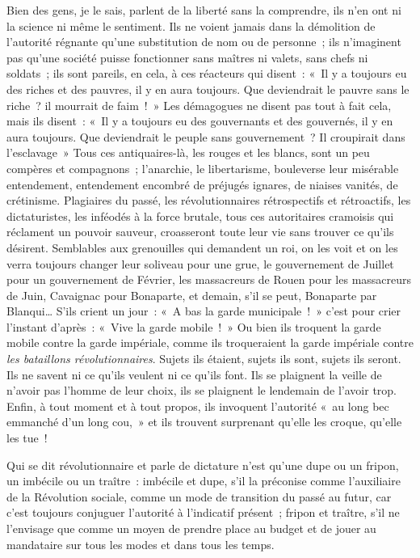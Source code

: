 \documentclass[french,twoside]{book} %
\begin{document}
Bien des gens, je le sais, parlent de la liberté sans la comprendre, ils n’en ont ni la science ni même le sentiment. Ils ne voient jamais dans la démolition de l’autorité régnante qu’une substitution de nom ou de personne ; ils n’imaginent pas qu’une société puisse fonctionner sans maîtres ni valets, sans chefs ni soldats ; ils sont pareils, en cela, à ces réacteurs qui disent : « Il y a toujours eu des riches et des pauvres, il y en aura toujours. Que deviendrait le pauvre sans le riche ? il mourrait de faim ! » Les démagogues ne disent pas tout à fait cela, mais ils disent : « Il y a toujours eu des gouvernants et des gouvernés, il y en aura toujours. Que deviendrait le peuple sans gouvernement ? Il croupirait dans l’esclavage » Tous ces antiquaires-là, les rouges et les blancs, sont un peu compères et compagnons ; l’anarchie, le libertarisme, bouleverse leur misérable entendement, entendement encombré de préjugés ignares, de niaises vanités, de crétinisme. Plagiaires du passé, les révolutionnaires rétrospectifs et rétroactifs, les dictaturistes, les inféodés à la force brutale, tous ces autoritaires cramoisis qui réclament un pouvoir sauveur, croasseront toute leur vie sans trouver ce qu’ils désirent. Semblables aux grenouilles qui demandent un roi, on les voit et on les verra toujours changer leur soliveau pour une grue, le gouvernement de Juillet pour un gouvernement de Février, les massacreurs de Rouen pour les massacreurs de Juin, Cavaignac pour Bonaparte, et demain, s’il se peut, Bonaparte par Blanqui… S’ils crient un jour : « A bas la garde municipale ! » c’est pour crier l’instant d’après : « Vive la garde mobile ! » Ou bien ils troquent la garde mobile contre la garde impériale, comme ils troqueraient la garde impériale contre \emph{les bataillons révolutionnaires}. Sujets ils étaient, sujets ils sont, sujets ils seront. Ils ne savent ni ce qu’ils veulent ni ce qu’ils font. Ils se plaignent la veille de n’avoir pas l’homme de leur choix, ils se plaignent le lendemain de l’avoir trop. Enfin, à tout moment et à tout propos, ils invoquent l’autorité « au long bec emmanché d’un long cou, » et ils trouvent surprenant qu’elle les croque, qu’elle les tue !\par
Qui se dit révolutionnaire et parle de dictature n’est qu’une dupe ou un fripon, un imbécile ou un traître : imbécile et dupe, s’il la préconise comme l’auxiliaire de la Révolution sociale, comme un mode de transition du passé au futur, car c’est toujours conjuguer l’autorité à l’indicatif présent ; fripon et traître, s’il ne l’envisage que comme un moyen de prendre place au budget et de jouer au mandataire sur tous les modes et dans tous les temps.\par
\end{document}
